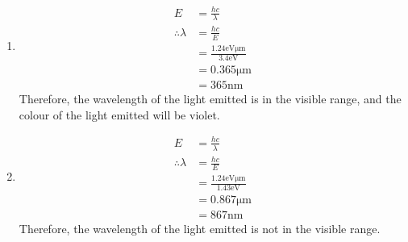 \documentclass[fleqn, a4paper, 11pt, oneside]{amsart}
\theoremstyle{definition}
\theoremstyle{theorem}
\begin{document}
\begin{solution}
	\begin{enumerate}[leftmargin=*]
		\item
			\begin{align*}
				E                  & = \frac{h c}{\lambda}                                                 \\
				\therefore \lambda & = \frac{h c}{E}                                                       \\
                                                   & = \frac{1.24 \si{\electronvolt \micro\metre}}{3.4 \si{\electronvolt}} \\
                                                   & = 0.365 \si{\micro\metre}                                             \\
                                                   & = 365 \si{\nano\metre}
			\end{align*}
			Therefore, the wavelength of the light emitted is in the visible range, and the colour of the light emitted will be violet.
		\item
			\begin{align*}
				E                  & = \frac{h c}{\lambda}                                                  \\
				\therefore \lambda & = \frac{h c}{E}                                                        \\
                                                   & = \frac{1.24 \si{\electronvolt \micro\metre}}{1.43 \si{\electronvolt}} \\
                                                   & = 0.867 \si{\micro\metre}                                              \\
                                                   & = 867 \si{\nano\metre}
			\end{align*}
			Therefore, the wavelength of the light emitted is not in the visible range.
	\end{enumerate}
\end{solution}
\end{document}
